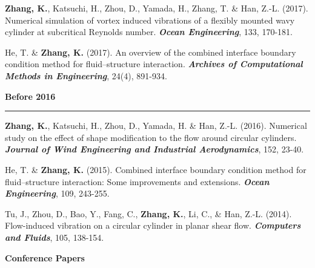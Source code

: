 \documentclass[10pt]{article}
\begin{document}
{\begin{etaremune}
  \item \textbf{Zhang, K.}, Katsuchi, H., Zhou, D., Yamada, H., Zhang, T. \& Han, Z.-L. (2017). Numerical simulation of vortex induced vibrations of a flexibly mounted wavy cylinder at subcritical Reynolds number. \textit{\textbf{Ocean Engineering}}, 133, 170-181.
  
  \item He, T. \& \textbf{Zhang, K.} (2017). An overview of the combined interface boundary condition method for fluid–structure interaction. \textit{\textbf{Archives of Computational Methods in Engineering}}, 24(4), 891-934.
  
 \item [] {\bf \color{Blue} Before 2016 \rule{13.6cm}{0.2mm}}   

  \item \textbf{Zhang, K.}, Katsuchi, H., Zhou, D., Yamada, H. \& Han, Z.-L. (2016). Numerical study on the effect of shape modification to the flow around circular cylinders. \textit{\textbf{Journal of Wind Engineering and Industrial Aerodynamics}}, 152, 23-40.  

  \item He, T. \& \textbf{Zhang, K.} (2015). Combined interface boundary condition method for fluid–structure interaction: Some improvements and extensions. \textit{\textbf{Ocean Engineering}}, 109, 243-255.
  
  \item Tu, J., Zhou, D., Bao, Y., Fang, C., \textbf{Zhang, K.}, Li, C., \& Han, Z.-L. (2014). Flow-induced vibration on a circular cylinder in planar shear flow. \textit{\textbf{Computers and Fluids}}, 105, 138-154.

\end{etaremune}
}

\vspace{+0.1in}
{\bf \color{Blue}Conference Papers}
\end{document}
